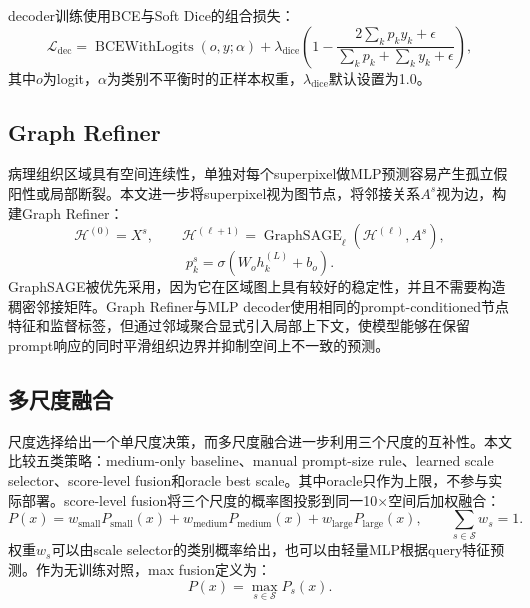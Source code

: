 \documentclass[UTF8]{ctexart}
\begin{document}
decoder训练使用BCE与Soft Dice的组合损失：
\begin{equation}
    \mathcal{L}_{\text{dec}}=
    \operatorname{BCEWithLogits}(o,y;\alpha)
    +\lambda_{\text{dice}}\left(
    1-\frac{2\sum_k p_k y_k+\epsilon}{\sum_k p_k+\sum_k y_k+\epsilon}
    \right),
\end{equation}
其中$o$为logit，$\alpha$为类别不平衡时的正样本权重，$\lambda_{\text{dice}}$默认设置为1.0。

\subsection{Graph Refiner}

病理组织区域具有空间连续性，单独对每个superpixel做MLP预测容易产生孤立假阳性或局部断裂。本文进一步将superpixel视为图节点，将邻接关系$A^s$视为边，构建Graph Refiner：
\begin{equation}
    \mathcal{H}^{(0)} = X^s, \qquad
    \mathcal{H}^{(\ell+1)}
    =
    \operatorname{GraphSAGE}_{\ell}
    \left(\mathcal{H}^{(\ell)}, A^s\right),
\end{equation}
\begin{equation}
    p_k^s = \sigma\left(W_o h_k^{(L)}+b_o\right).
\end{equation}
GraphSAGE被优先采用，因为它在区域图上具有较好的稳定性，并且不需要构造稠密邻接矩阵。Graph Refiner与MLP decoder使用相同的prompt-conditioned节点特征和监督标签，但通过邻域聚合显式引入局部上下文，使模型能够在保留prompt响应的同时平滑组织边界并抑制空间上不一致的预测。

\subsection{多尺度融合}

尺度选择给出一个单尺度决策，而多尺度融合进一步利用三个尺度的互补性。本文比较五类策略：medium-only baseline、manual prompt-size rule、learned scale selector、score-level fusion和oracle best scale。其中oracle只作为上限，不参与实际部署。score-level fusion将三个尺度的概率图投影到同一10$\times$空间后加权融合：
\begin{equation}
    P(x)=
    w_{\text{small}}P_{\text{small}}(x)
    +w_{\text{medium}}P_{\text{medium}}(x)
    +w_{\text{large}}P_{\text{large}}(x),
    \qquad
    \sum_{s\in\mathcal{S}}w_s=1.
\end{equation}
权重$w_s$可以由scale selector的类别概率给出，也可以由轻量MLP根据query特征预测。作为无训练对照，max fusion定义为：
\begin{equation}
    P(x)=\max_{s\in\mathcal{S}} P_s(x).
\end{equation}
\end{document}
